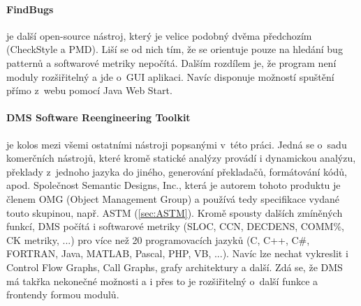 \documentclass[11pt,twoside,a4paper]{book}
\begin{document}
\paragraph{FindBugs}\cite{FindBugs} je další open-source nástroj, který je velice podobný dvěma předchozím (CheckStyle a PMD).
Liší se od nich tím, že se orientuje pouze na hledání bug patternů a softwarové metriky nepočítá.
Dalším rozdílem je, že program není moduly rozšiřitelný a jde o~GUI aplikaci. Navíc disponuje možností spuštění přímo z~webu pomocí Java Web Start.

\paragraph{DMS Software Reengineering Toolkit}\cite{DMS} je kolos mezi všemi ostatními nástroji popsanými v~této práci. Jedná se o~sadu
komerčních nástrojů, které kromě statické analýzy provádí i dynamickou analýzu, překlady z~jednoho jazyka do jiného, generování
překladačů, formátování kódů, apod. Společnost Semantic Designs, Inc., která je autorem tohoto produktu je členem OMG (Object Management Group)
a používá tedy specifikace vydané touto skupinou, např. ASTM (\ref{sec:ASTM}). Kromě spousty dalších zmíněných funkcí, DMS počítá
i softwarové metriky (SLOC, CCN, DECDENS, COMM\%, CK metriky, ...) pro více než 20 programovacích jazyků (C, C++, C\#, FORTRAN,
Java, MATLAB, Pascal, PHP, VB, ...). Navíc lze nechat vykreslit i Control Flow Graphs, Call Graphs, grafy architektury a další.
Zdá se, že DMS má takřka nekonečné možnosti a i přes to je rozšiřitelný o~další funkce a frontendy formou modulů.
\end{document}
